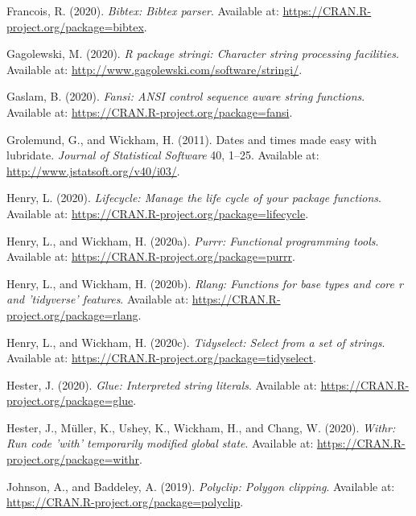 \documentclass[utf8]{frontiersSCNS}
\newlength{\cslhangindent}
\newenvironment{cslreferences}%
  {\setlength{\parindent}{0pt}%
  \everypar{\setlength{\hangindent}{\cslhangindent}}\ignorespaces}%
  {\par}
\begin{document}
\begin{cslreferences}
\leavevmode\hypertarget{ref-francois2020bibtex}{}%
Francois, R. (2020). \emph{Bibtex: Bibtex parser}. Available at:
\url{https://CRAN.R-project.org/package=bibtex}.

\leavevmode\hypertarget{ref-gagolewski2020package}{}%
Gagolewski, M. (2020). \emph{R package stringi: Character string
processing facilities}. Available at:
\url{http://www.gagolewski.com/software/stringi/}.

\leavevmode\hypertarget{ref-gaslam2020fansi}{}%
Gaslam, B. (2020). \emph{Fansi: ANSI control sequence aware string
functions}. Available at:
\url{https://CRAN.R-project.org/package=fansi}.

\leavevmode\hypertarget{ref-grolemund2011dates}{}%
Grolemund, G., and Wickham, H. (2011). Dates and times made easy with
lubridate. \emph{Journal of Statistical Software} 40, 1--25. Available
at: \url{http://www.jstatsoft.org/v40/i03/}.

\leavevmode\hypertarget{ref-henry2020lifecycle}{}%
Henry, L. (2020). \emph{Lifecycle: Manage the life cycle of your package
functions}. Available at:
\url{https://CRAN.R-project.org/package=lifecycle}.

\leavevmode\hypertarget{ref-henry2020purrr}{}%
Henry, L., and Wickham, H. (2020a). \emph{Purrr: Functional programming
tools}. Available at: \url{https://CRAN.R-project.org/package=purrr}.

\leavevmode\hypertarget{ref-henry2020rlang}{}%
Henry, L., and Wickham, H. (2020b). \emph{Rlang: Functions for base
types and core r and 'tidyverse' features}. Available at:
\url{https://CRAN.R-project.org/package=rlang}.

\leavevmode\hypertarget{ref-henry2020tidyselect}{}%
Henry, L., and Wickham, H. (2020c). \emph{Tidyselect: Select from a set
of strings}. Available at:
\url{https://CRAN.R-project.org/package=tidyselect}.

\leavevmode\hypertarget{ref-hester2020glue}{}%
Hester, J. (2020). \emph{Glue: Interpreted string literals}. Available
at: \url{https://CRAN.R-project.org/package=glue}.

\leavevmode\hypertarget{ref-hester2020withr}{}%
Hester, J., Müller, K., Ushey, K., Wickham, H., and Chang, W. (2020).
\emph{Withr: Run code 'with' temporarily modified global state}.
Available at: \url{https://CRAN.R-project.org/package=withr}.

\leavevmode\hypertarget{ref-johnson2019polyclip}{}%
Johnson, A., and Baddeley, A. (2019). \emph{Polyclip: Polygon clipping}.
Available at: \url{https://CRAN.R-project.org/package=polyclip}.


\end{cslreferences}
\end{document}
